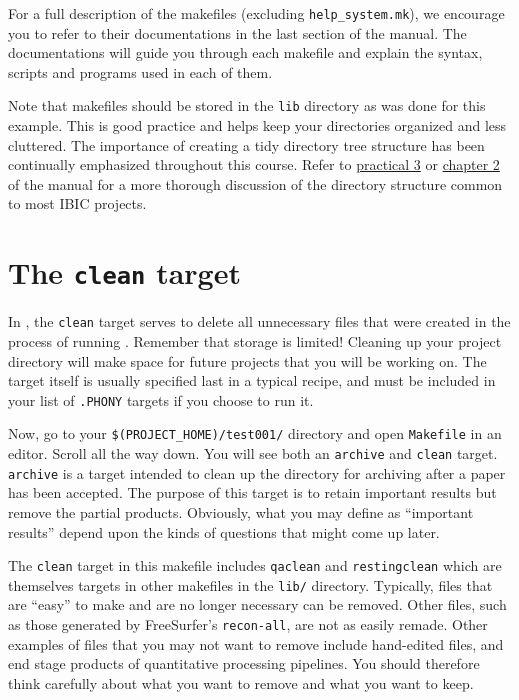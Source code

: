 For a full description of the makefiles (excluding \texttt{help_system.mk}), we encourage you to refer to their documentations in the last section of the manual. The documentations will guide you through each makefile and explain the syntax, scripts and programs used in each of them. %

Note that makefiles should be stored in the \texttt{lib} directory as was done for this example. This is good practice and helps keep your directories organized and less cluttered. The importance of creating a tidy directory tree structure has been continually emphasized throughout this course. Refer to \hyperref[practicum3]{practical 3} or \hyperref[sec:dir]{chapter 2} of the manual for a more thorough discussion of the directory structure common to most IBIC projects.

\section{The \texttt{clean} target}
In \maken{}, the \texttt{clean} target serves to delete all unnecessary files that were created in the process of running \maken{}. Remember that storage is limited! Cleaning up your project directory will make space for future projects that you will be working on. The target itself is usually specified last in a typical \maken{} recipe, and must be included in your list of \texttt{.PHONY} targets if you choose to run it. 

Now, go to your \texttt{\$(PROJECT_HOME)/test001/} directory and open \texttt{Makefile} in an editor. Scroll all the way down. You will see both an \texttt{archive} and \texttt{clean} target. \texttt{archive} is a target intended to clean up the directory for archiving after a paper has been accepted. The purpose of this target is to retain important results but remove the partial products. Obviously, what you may define as ``important results'' depend upon the kinds of questions that might come up later. 

The \texttt{clean} target in this makefile includes \texttt{qaclean} and \texttt{restingclean} which are themselves targets in other makefiles in the \texttt{lib/} directory. Typically, files that are ``easy'' to make and are no longer necessary can be removed. Other files, such as those generated by FreeSurfer's \texttt{recon-all}, are not as easily remade. Other examples of files that you may not want to remove include hand-edited files, and end stage products of quantitative processing pipelines. You should therefore think carefully about what you want to remove and what you want to keep. 

